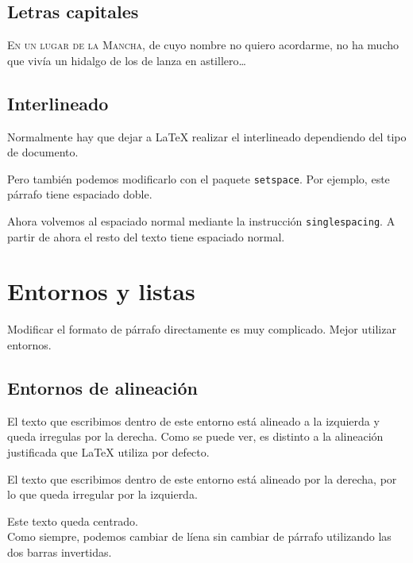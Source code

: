 \documentclass[11pt,twoside,a4paper]{article}
\begin{document}
\subsection{Letras capitales}
\label{sec:letrascapitales}
\lettrine{E}{n un lugar de la Mancha}, de cuyo nombre no quiero acordarme, no ha mucho que vivía un hidalgo de los de lanza en astillero\ldots{}

\subsection{Interlineado}
\label{sec:interlineado}

Normalmente hay que dejar a \LaTeX{} realizar el interlineado dependiendo del tipo de documento.

\doublespacing
Pero también podemos modificarlo con el paquete \texttt{setspace}. Por ejemplo, este párrafo tiene espaciado doble.

\singlespacing
Ahora volvemos al espaciado normal mediante la instrucción \texttt{singlespacing}. A partir de ahora el resto del texto tiene espaciado normal.

\section{Entornos y listas}
\label{sec:entornosylistas}

Modificar el formato de párrafo directamente es muy complicado. Mejor utilizar entornos.

\subsection{Entornos de alineación}
\label{sec:entornoalineacion}

El texto que escribimos dentro de este entorno está alineado a la izquierda y queda irregulas por la derecha. Como se puede ver, es distinto a la alineación justificada que \LaTeX{} utiliza por defecto.

\begin{flushright}
  El texto que escribimos dentro de este entorno está alineado por la derecha, por lo que queda irregular por la izquierda.
\end{flushright}

\begin{center}
  Este texto queda centrado.\\
Como siempre, podemos cambiar de líena sin cambiar de párrafo utilizando las dos barras invertidas.
\end{center}
\end{document}
